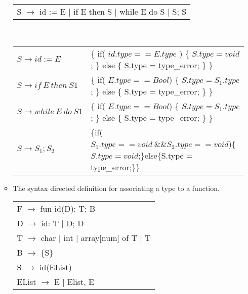 \documentclass[10pt]{article}
\begin{document}
\begin{enumerate}
\begin{itemize}
\begin{table}[h]
\begin{tabular}{l}
                            S $\rightarrow$ id := E $\big|$ if E then S $\big|$ while E do S $\big|$ S; S
                        \end{tabular}
                    \end{table}
                    \textcolor{blue}{\\
                        \begin{tabular}{ll}
                            $S \rightarrow id:=E$            & \{ if( $id.type==E.type$ ) \{ $S.type=void$; \} else \{ S.type = type\_error; \} \}           \\
                            $S \rightarrow if\ E\ then\ S1$  & \{ if( $E.type==Bool $) \{ $S.type=S_1.type$; \} else \{ S.type = type\_error; \} \}          \\
                            $S \rightarrow while\ E\ do\ S1$ & \{ if( $E.type==Bool $) \{ $S.type=S_1.type$; \} else \{ S.type = type\_error; \} \}          \\
                            $S \rightarrow S_1;S_2$          & \{if( $S_1.type==void\ \&\& S_2.type==void$)\{$S.type=void$;\}else\{S.type = type\_error;\}\} \\
                        \end{tabular}
                    }
              \item The syntax directed definition for associating a type to a function.
                    \begin{table}[h]
                        \centering
                        \begin{tabular}{l}
                            F $\rightarrow$ fun id(D): T; B                                          \\
                            D $\rightarrow$ id: T $\big|$ D; D                                       \\
                            T $\rightarrow$ char $\big|$  int $\big|$  array{[}num{]} of T $\big|$ T \\
                            B $\rightarrow$ \{S\}                                                    \\
                            S $\rightarrow$ id(EList)                                                \\
                            EList $\rightarrow$ E $\big|$  Elist, E
                        \end{tabular}
                    \end{table}
                    \textcolor{blue}{\\
}
\end{itemize}
\end{enumerate}
\end{document}
